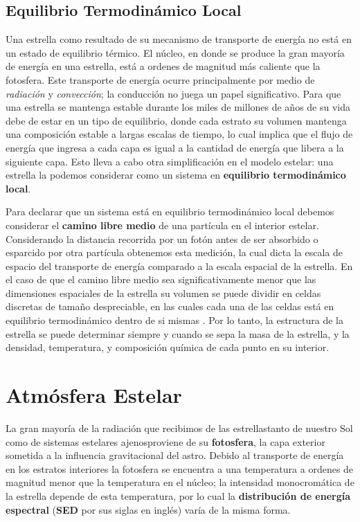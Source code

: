 \subsection{Equilibrio Termodinámico Local}

Una estrella como resultado de su mecanismo de transporte de energía no está en
un estado de equilibrio térmico. El núcleo, en donde se produce la gran mayoría
de energía en una estrella, está a ordenes de magnitud más caliente que la
fotosfera. Este transporte de energía ocurre principalmente por medio de
\textit{radiación} y \textit{convección}; la conducción no juega un papel
significativo. Para que una estrella se mantenga estable durante los miles de
millones de años de su vida debe de estar en un tipo de equilibrio, donde cada
estrato su volumen mantenga una composición estable a largas escalas de tiempo,
lo cual implica que el flujo de energía que ingresa a cada capa es igual a la
cantidad de energía que libera a la siguiente capa. Esto lleva a cabo otra
simplificación en el modelo estelar: una estrella la podemos considerar como un
sistema en \textbf{equilibrio termodinámico local}.

Para declarar que un sistema está en equilibrio termodinámico local debemos
considerar el \textbf{camino libre medio} de una partícula en el interior
estelar. Considerando la distancia recorrida por un fotón antes de ser absorbido
o esparcido por otra partícula obtenemos esta medición, la cual dicta la escala
de espacio del transporte de energía comparado a la escala espacial de la
estrella. En el caso de que el camino libre medio sea significativamente menor
que las dimensiones espaciales de la estrella su volumen se puede dividir en
celdas discretas de tamaño despreciable, en las cuales cada una de las celdas
está en equilibrio termodinámico dentro de si mismas
. Por lo tanto, la
estructura de la estrella se puede determinar siempre y cuando se sepa la masa
de la estrella, y la densidad, temperatura, y composición química de cada punto
en su interior.

\section{Atmósfera Estelar}

La gran mayoría de la radiación que recibimos de las estrellas\textemdash tanto
de nuestro Sol como de sistemas estelares ajenos\textemdash proviene de su
\textbf{fotosfera}, la capa exterior sometida a la influencia gravitacional del
astro. Debido al transporte de energía en los estratos interiores la fotosfera
se encuentra a una temperatura a ordenes de magnitud menor que la temperatura en
el núcleo; la intensidad monocromática de la estrella depende de esta
temperatura, por lo cual la \textbf{distribución de energía espectral}
(\textbf{SED} por sus siglas en inglés) varía de la misma forma. %

